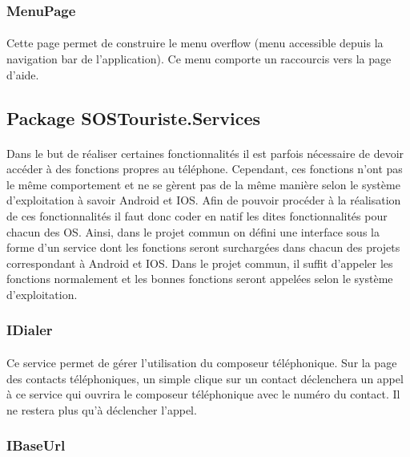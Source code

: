 	\subsubsection{MenuPage}
		\paragraph{}
			Cette page permet de construire le menu overflow (menu accessible depuis la navigation bar de l'application). Ce menu comporte un raccourcis vers la page d'aide.

\subsection{Package SOSTouriste.Services}
	\paragraph{}
		Dans le but de réaliser certaines fonctionnalités il est parfois nécessaire de devoir accéder à des fonctions propres au téléphone. Cependant, ces fonctions n'ont pas le même comportement et ne se gèrent pas de la même manière selon le système d'exploitation à savoir Android et IOS. Afin de pouvoir procéder à la réalisation de ces fonctionnalités il faut donc coder en natif les dites fonctionnalités pour chacun des OS. Ainsi, dans le projet commun on défini une interface sous la forme d'un service dont les fonctions seront surchargées dans chacun des projets correspondant à Android et IOS. Dans le projet commun, il suffit d'appeler les fonctions normalement et les bonnes fonctions seront appelées selon le système d'exploitation.

	\subsubsection{IDialer}
		\paragraph{}
			Ce service permet de gérer l'utilisation du composeur téléphonique. Sur la page des contacts téléphoniques, un simple clique sur un contact déclenchera un appel à ce service qui ouvrira le composeur téléphonique avec le numéro du contact. Il ne restera plus qu'à déclencher l'appel.
			
	\subsubsection{IBaseUrl}
